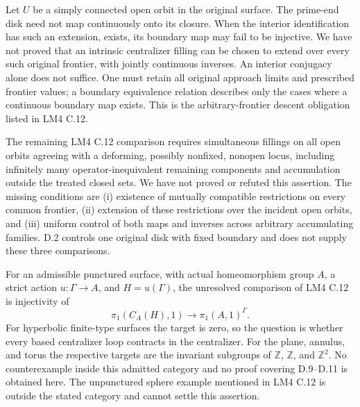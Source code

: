 Let $U$ be a simply connected open orbit in the original surface.
The prime-end disk need not map continuously onto its closure.
When the interior identification has such an extension,
exists, its boundary map may fail to be injective.
We have not proved that an intrinsic centralizer filling can
be chosen to extend over every such original frontier, with
jointly continuous inverses.  An interior conjugacy alone does
not suffice.  One must retain all original approach limits and
prescribed frontier values; a boundary equivalence relation
describes only the cases where a continuous boundary map exists.
This is the
arbitrary-frontier descent obligation listed in LM4 C.12.

The remaining LM4 C.12 comparison requires simultaneous fillings
on all open orbits agreeing with a deforming, possibly nonfixed,
nonopen locus, including infinitely many operator-inequivalent
remaining components and accumulation outside the treated closed
sets.  We have not proved or refuted this assertion.  The missing
conditions are (i) existence of mutually compatible restrictions
on every common frontier, (ii) extension of these restrictions over
the incident open orbits, and (iii) uniform control of both maps
and inverses across arbitrary accumulating families.  D.2 controls
one original disk with fixed boundary and does not supply these
three comparisons.

For an admissible punctured surface, with actual homeomorphism
group $A$, a strict action $u:\Gamma\to A$, and $H=u(\Gamma)$,
the unresolved comparison of LM4 C.12 is injectivity of
\[
 \pi_1(C_A(H),1)\longrightarrow\pi_1(A,1)^\Gamma.
\]
For hyperbolic finite-type surfaces the target is zero, so the
question is whether every based centralizer loop contracts in
the centralizer.  For the plane, annulus, and torus the respective
targets are the invariant subgroups of $\mathbb Z$, $\mathbb Z$,
and $\mathbb Z^2$.  No counterexample inside this admitted
category and no proof covering D.9--D.11 is obtained here.  The
unpunctured sphere example mentioned in LM4 C.12 is outside the
stated category and cannot settle this assertion.

